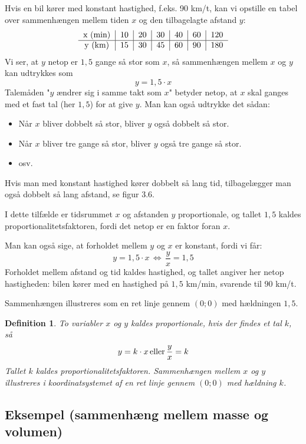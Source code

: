 \documentclass[12pt,oneside,a4paper]{article}
\newtheorem{mydef}[thm]{Definition}
\begin{document}
Hvis en bil kører med konstant hastighed, f.eks. 90 km/t, kan vi opstille en
tabel over sammenhængen mellem tiden $x$ og den tilbagelagte afstand $y$:
$$
\begin{tabular}{c|c|c|c|c|c|c}
    x ({\rm min}) & 10 & 20 & 30 & 40 & 60 & 120 \\
    \hline
    y ({\rm km})  & 15 & 30 & 45 & 60 & 90 & 180  
\end{tabular}
$$
Vi ser, at $y$ netop er $1,5$ gange så stor som $x$, så sammenhængen mellem $x$
og $y$ kan udtrykkes som
$$
y = 1,5\cdot x
$$
Talemåden "$y$ ændrer sig i samme takt som $x$" betyder netop, at $x$ skal
ganges med et fast tal (her $1,5$) for at give $y$. Man kan også udtrykke det
sådan:
\begin{itemize}
    \item Når $x$ bliver dobbelt så stor, bliver $y$ også dobbelt så stor.
    \item Når $x$ bliver tre gange så stor, bliver $y$ også tre gange så stor.
    \item osv.
\end{itemize}
Hvis man med konstant hastighed kører dobbelt så lang tid, tilbagelægger man
også dobbelt så lang afstand, se figur 3.6.

I dette tilfælde er tidsrummet $x$ og afstanden $y$ proportionale, og tallet
$1,5$ kaldes proportionalitetsfaktoren, fordi det netop er en faktor foran $x$.

Man kan også sige, at forholdet mellem $y$ og $x$ er konstant, fordi vi får:
$$
y = 1,5\cdot x \, \Leftrightarrow \, \frac{y}{x} = 1,5
$$
Forholdet mellem afstand og tid kaldes hastighed, og tallet angiver her netop
hastigheden: bilen kører med en hastighed på $1,5$ km/min, svarende til $90$
km/t.

Sammenhængen illustreres som en ret linje gennem $(0;0)$ med hældningen $1,5$.

\begin{mydef}
    To variabler $x$ og $y$ kaldes proportionale, hvis der findes et tal $k$, så
    $$
    y = k\cdot x \, {\rm eller} \, \frac{y}{x} = k
    $$
    Tallet $k$ kaldes proportionalitetsfaktoren. Sammenhængen mellem $x$ og $y$
    illustreres i koordinatsystemet af en ret linje gennem $(0; 0)$ med 
    hældning $k$.
\end{mydef}

\subsection{Eksempel (sammenhæng mellem masse og volumen)}
\end{document}
